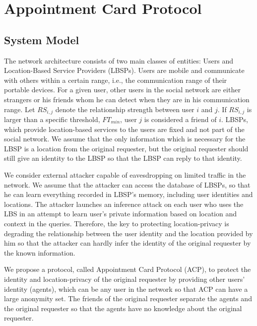 


\chapter{ Appointment Card Protocol}
\label{CACP}
 
\section{ System Model}

\noindent The network architecture consists of two main classes of entities: Users and Location-Based Service Providers (LBSPs). Users are mobile and communicate with others within a certain range, i.e., the communication range of their portable devices. For a given user, other users in the social network are either strangers or his friends whom he can detect when they are in his communication range. Let ${RS}_{i,j}$ denote the relationship strength between user $i$ and $j$. If ${RS}_{i,j}$ is larger than a specific threshold, ${FT}_{min}$, user $j$ is considered a friend of $i$. LBSPs, which provide location-based services to the users are fixed and not part of the social network. We assume that the only information which is necessary for the LBSP is a location from the original requester, but the original requester should still give an identity to the LBSP so that the LBSP can reply to that identity.

We consider external attacker capable of eavesdropping on limited traffic in the network. We assume that the attacker can access the database of LBSPs, so that he can learn everything recorded in LBSP's memory, including user identities and locations. The attacker launches an inference attack on each user who uses the LBS in an attempt to learn user's private information based on location and context in the queries. Therefore, the key to protecting location-privacy is degrading the relationship between the user identity and the location provided by him so that the attacker can hardly infer the identity of the original requester by the known information. 

We propose a protocol, called Appointment Card Protocol (ACP), to protect the identity and location-privacy of the original requester by providing other users' identity (agents), which can be any user in the network so that ACP can have a large anonymity set. The friends of the original requester separate the agents and the original requester so that the agents have no knowledge about the original requester.


